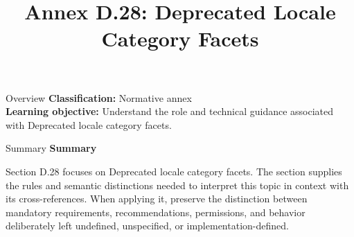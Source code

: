 \documentclass[10pt,letterpaper]{article}
\title{Annex D.28: Deprecated Locale Category Facets}
\author{}
\date{}
\begin{document}
\maketitle
\begin{CornellOverviewBox}{Overview}
\textbf{Classification:} Normative annex\\[2pt]
\textbf{Learning objective:} Understand the role and technical guidance associated with Deprecated locale category facets.
\end{CornellOverviewBox}\begin{CornellSummaryBox}{Summary}
{\sffamily\bfseries\color{Accent} Summary}\par\vspace{3pt}Section D.28 focuses on Deprecated locale category facets. The section supplies the rules and semantic distinctions needed to interpret this topic in context with its cross-references. When applying it, preserve the distinction between mandatory requirements, recommendations, permissions, and behavior deliberately left undefined, unspecified, or implementation-defined.
\end{CornellSummaryBox}
\end{document}
